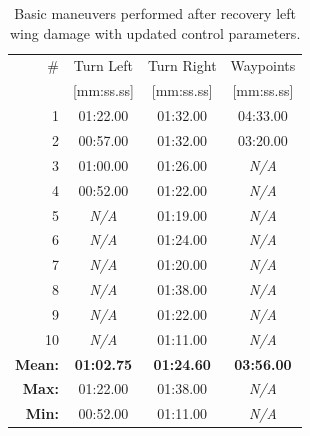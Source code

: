 \begin{table}
\centering
\renewcommand{\arraystretch}{1.0}
\begin{tabular}{rccc}
\hline
\# & Turn Left & Turn Right & Waypoints\\
 & [mm:ss.ss] & [mm:ss.ss] & [mm:ss.ss]\\
\hline
\rowcolor{Gray}
1 & 01:22.00 & 01:32.00 & 04:33.00\\
2 & 00:57.00 & 01:32.00 & 03:20.00\\
\rowcolor{Gray}
3 & 01:00.00 & 01:26.00 & \textit{N/A}\\
4 & 00:52.00 & 01:22.00 & \textit{N/A}\\
\rowcolor{Gray}
5 & \textit{N/A} & 01:19.00 & \textit{N/A}\\
6 & \textit{N/A} & 01:24.00 & \textit{N/A}\\
\rowcolor{Gray}
7 & \textit{N/A} & 01:20.00 & \textit{N/A}\\
8 & \textit{N/A} & 01:38.00 & \textit{N/A}\\
\rowcolor{Gray}
9 & \textit{N/A} & 01:22.00 & \textit{N/A}\\
10 & \textit{N/A} & 01:11.00 & \textit{N/A}\\
\hline
\textbf{Mean:} & \textbf{01:02.75} & \textbf{01:24.60} & \textbf{03:56.00}\\
\textbf{Max:} & 01:22.00 & 01:38.00 & \textit{N/A}\\
\textbf{Min:} & 00:52.00 & 01:11.00 & \textit{N/A}\\
\hline
\end{tabular}
\newline
\caption[Basic maneuvers performed after recovery]{Basic maneuvers performed after recovery left wing damage with updated control parameters.}
\label{tab:times-repaired}
\end{table}


